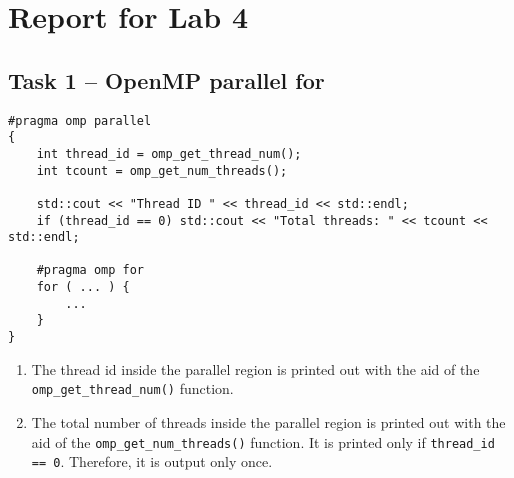 \documentclass[a4paper, DIV12, headsepline]{scrartcl}
\begin{document}
\section*{Report for Lab 4}
\subsection*{Task 1 -- OpenMP parallel for}
\begin{verbatim}
#pragma omp parallel
{
    int thread_id = omp_get_thread_num();
    int tcount = omp_get_num_threads();

    std::cout << "Thread ID " << thread_id << std::endl;
    if (thread_id == 0) std::cout << "Total threads: " << tcount << std::endl;

    #pragma omp for
    for ( ... ) {
        ...
    }
}
\end{verbatim}
\begin{enumerate}
\item The thread id inside the parallel region is printed out with the aid of the \texttt{omp\_get\_thread\_num()} function.

\item The total number of threads inside the parallel region is printed out with the aid of the \verb|omp_get_num_threads()| function. It is printed only if \verb|thread_id == 0|. Therefore, it is output only once.
\end{enumerate}
\end{document}
